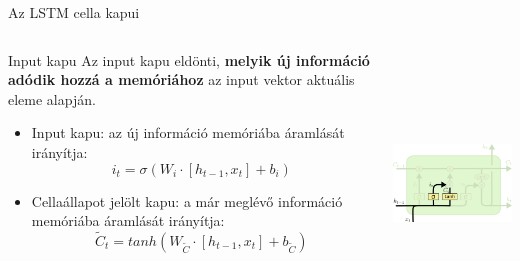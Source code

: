 \documentclass[english, aspectratio=169]{beamer}
\begin{document}
\begin{frame}{Az LSTM cella kapui}
\begin{columns}
\begin{column}{.5\textwidth}
\begin{block}{Input kapu}
Az input kapu eldönti, \textbf{melyik új információ adódik hozzá a memóriához} az input vektor aktuális eleme alapján.
\begin{itemize}
	\item Input kapu: az új információ memóriába áramlását irányítja:
	\[
	i_t = \sigma \left( W_i \cdot \left[ h_{t-1}, x_t \right] + b_i \right) 
	\]
	\item Cellaállapot jelölt kapu: a már meglévő információ memóriába áramlását irányítja: 
	\[
	\tilde{C}_t = tanh \left( W_{\tilde{C}} \cdot \left[ h_{t-1}, x_t \right] + b_{\tilde{C}} \right)
	\]
\end{itemize}
\end{block}
\end{column}
\begin{column}{.5\textwidth}
\begin{center}
\includegraphics[width=7cm, height=7cm, keepaspectratio]{images/recurrent_9.png}
\end{center}
\end{column}
\end{columns}
\end{frame}
\end{document}
